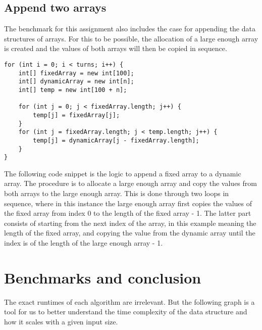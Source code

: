 \documentclass[a4paper,11pt]{article}
\begin{document}
    \subsection*{Append two arrays}

        The benchmark for this assignment also includes the case for appending the data structures of arrays. For this to be possible, the allocation of a large enough array is created and the values of both arrays will then be copied in sequence.
\begin{verbatim}
for (int i = 0; i < turns; i++) {
    int[] fixedArray = new int[100];
    int[] dynamicArray = new int[n];
    int[] temp = new int[100 + n];

    for (int j = 0; j < fixedArray.length; j++) {
        temp[j] = fixedArray[j];
    }
    for (int j = fixedArray.length; j < temp.length; j++) {
        temp[j] = dynamicArray[j - fixedArray.length];
    }
}
\end{verbatim}
        The following code snippet is the logic to append a fixed array to a dynamic array. The procedure is to allocate a large enough array and copy the values from both arrays to the large enough array. This is done through two loops in sequence, where in this instance the large enough array first copies the values of the fixed array from index 0 to the length of the fixed array - 1. The latter part consists of starting from the next index of the array, in this example meaning the length of the fixed array, and copying the value from the dynamic array until the index is of the length of the large enough array - 1. 

\section*{Benchmarks and conclusion}

    The exact runtimes of each algorithm are irrelevant. But the following graph is a tool for us to better understand the time complexity of the data structure and how it scales with a given input size.
\end{document}
